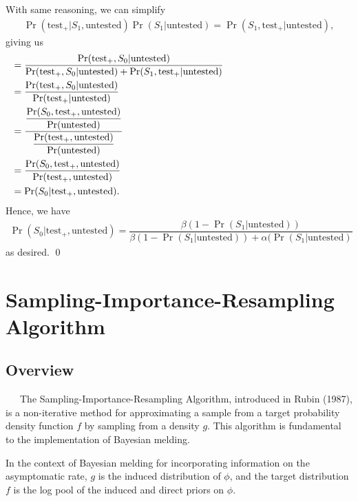 \documentclass[12pt,twoside]{smiththesis}
\begin{document}
With same reasoning, we can simplify
\begin{align*}
\Pr(\text{test}_+|S_1, \text{untested})\Pr(S_1|\text{untested}) = \Pr(S_1, \text{test}_+|\text{untested}),
\end{align*} giving us
\begin{align*}
  &=  \dfrac{{\Pr(\text{test}_+,S_0|\text{untested})}}{\Pr(\text{test}_+,S_0|\text{untested}) +  \Pr(S_1, \text{test}_+|\text{untested})} \hspace{45 mm }\\ 
   &=  \dfrac{{\Pr(\text{test}_+,S_0|\text{untested})}}{\Pr(\text{test}_+|\text{untested}) } \\
   &= \dfrac{\dfrac{\Pr(S_0, \text{test}_+, \text{untested})}{\Pr(\text{untested})}}{ \dfrac{\Pr(\text{test}_+,\text{untested})}{\Pr(\text{untested})}} \\ 
  &=\dfrac{\Pr(S_0, \text{test}_+, \text{untested})}{\Pr(\text{test}_+,\text{untested})} \\
  &= \Pr(S_0 |\text{test}_+, \text{untested}).
\end{align*}
\noindent Hence, we have
\begin{align*}
\Pr(S_0 |\text{test}_+, \text{untested}) = \dfrac{\beta (1- \Pr(S_1|\text{untested}))}{\beta(1- \Pr(S_1|\text{untested})) + \alpha(\Pr(S_1|\text{untested})}
\end{align*}
\noindent as desired.
\qed

\newpage

\hypertarget{sampling}{%
\section{Sampling-Importance-Resampling Algorithm}\label{sampling}}

\hypertarget{overview-1}{%
\subsection{Overview}\label{overview-1}}

~~~The Sampling-Importance-Resampling Algorithm, introduced in Rubin (1987), is a non-iterative method for approximating a sample from a target probability density function \(f\) by sampling from a density \(g\). This algorithm is fundamental to the implementation of Bayesian melding.

In the context of Bayesian melding for incorporating information on the asymptomatic rate, \(g\) is the induced distribution of \(\phi\), and the target distribution \(f\) is the log pool of the induced and direct priors on \(\phi\).
\end{document}
